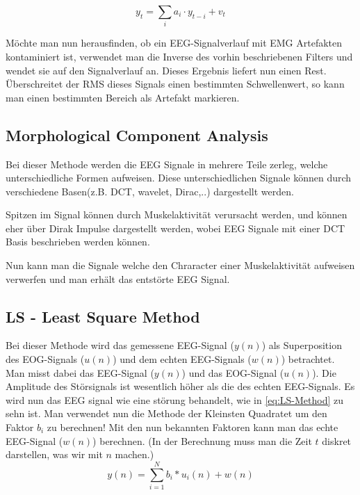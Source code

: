 \documentclass[preprint,12pt]{elsarticle}
\begin{document}
\begin{equation}
y_t = \sum_i a_i \cdot y_{t-i} + v_t
\end{equation}

Möchte man nun herausfinden, ob ein EEG-Signalverlauf mit EMG Artefakten kontaminiert ist, verwendet man die Inverse
des vorhin beschriebenen Filters und wendet sie auf den Signalverlauf an. Dieses Ergebnis liefert nun einen Rest.
Überschreitet der RMS dieses Signals einen bestimmten Schwellenwert, so kann man einen bestimmten Bereich als Artefakt markieren.
~\cite{Pfurtscheller2007}

\subsection{Morphological Component Analysis}

Bei dieser Methode werden die EEG Signale in mehrere Teile zerleg, welche unterschiedliche Formen aufweisen.
Diese unterschiedlichen Signale können durch verschiedene Basen(z.B. DCT, wavelet, Dirac,..) dargestellt werden.

Spitzen im Signal können durch Muskelaktivität verursacht werden, und können eher über Dirak Impulse dargestellt
werden, wobei EEG Signale mit einer DCT Basis beschrieben werden können.

Nun kann man die Signale welche den Chraracter einer Muskelaktivität aufweisen verwerfen und man erhält das entstörte EEG Signal.
\cite{Yong2009}


\subsection{LS - Least Square Method}

Bei dieser Methode wird das gemessene EEG-Signal ($y(n)$) als Superposition des EOG-Signals ($u(n)$) und dem echten EEG-Signals
 ($w(n)$) betrachtet. Man misst dabei das EEG-Signal ($y(n)$) und das EOG-Signal ($u(n)$). Die Amplitude des Störsignals ist wesentlich höher als die des
 echten EEG-Signals. Es wird nun das EEG signal wie eine störung behandelt, wie in \ref{eq:LS-Method} zu sehn ist. Man verwendet nun die Methode der Kleinsten
 Quadratet um den Faktor $b_i$ zu berechnen! Mit den nun bekannten Faktoren kann man das echte EEG-Signal ($w(n)$) berechnen.
(In der Berechnung muss man die Zeit $t$ diskret darstellen, was wir mit $n$  machen.)~\cite{Thulasidas2004}
\begin{equation} \label{eq:LS-Method}
 y(n) =  \sum_{i=1}^{N} b_i * u_i(n) + w(n)
\end{equation}
\end{document}

